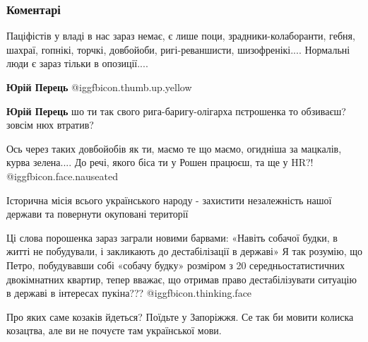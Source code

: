  
 
 
 
 
\subsubsection{Коментарі}

\begin{itemize} %

Паціфістів у владі в нас зараз немає, є лише поци, зрадники-колаборанти, гебня,
шахраї, гопнікі, торчкі, довбойоби, ригі-реваншисти, шизофренікі.... Нормальні
люди є зараз тільки в опозиції....

\begin{itemize} %
\textbf{Юрій Перець}  @igg{fbicon.thumb.up.yellow} 

\textbf{Юрій Перець} шо ти так свого рига-баригу-олігарха пєтрошенка то обзиваєш? зовсім нюх втратив?


Ось через таких довбойобів як ти, маємо те що маємо, огидніша за мацкалів, курва зелена....
До речі, якого біса ти у Рошен працюєш, та ще у HR?! @igg{fbicon.face.nauseated} 
\end{itemize} %


Історична місія всього українського народу - захистити незалежність нашої держави та повернути окуповані території


Ці слова порошенка зараз заграли новими барвами:
«Навіть собачої будки, в житті не побудували, і закликають до дестабілізації в державі»
Я так розумію, що Петро, побудувавши собі «собачу будку» розміром з 20 середньостатистичних двокімнатних квартир, тепер вважає, що отримав право дестабілізувати ситуацію в державі в інтересах пукіна???  @igg{fbicon.thinking.face} 


Про яких саме козаків йдеться? Поїдьте у Запоріжжя. Се так би мовити колиска
козацтва, але ви не почуєте там української мови.

\end{itemize} %
